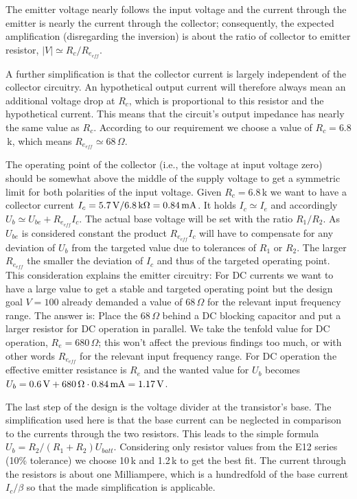 The emitter voltage nearly follows the input voltage and the current
through the emitter is nearly the current through the collector;
consequently, the expected amplification (disregarding the inversion) is
about the ratio of collector to emitter resistor,
$\left| V \right| \simeq R_c/R_{e_{eff}}$.

A further simplification is that the collector current is largely
independent of the collector circuitry. An hypothetical output current
will therefore always mean an additional voltage drop at $R_c$, which is
proportional to this resistor and the hypothetical current. This means
that the circuit's output impedance has nearly the same value as $R_c$.
According to our requirement we choose a value of $R_c=6.8$\,k, which
means $R_{e_{eff}} \simeq 68\,\Omega$.

The operating point of the collector (i.e., the voltage at input voltage
zero) should be somewhat above the middle of the supply voltage to get a
symmetric limit for both polarities of the input voltage. Given $R_c=6.8$\,k
we want to have a collector current
$I_c=5.7\text{\,V}/6.8\text{\,k}\Omega=0.84\text{\,mA}$. It holds
$I_c \simeq I_e$ and accordingly $U_b \simeq U_{be} + R_{e_{eff}} I_c$.
The actual base voltage will be set with the ratio $R_1/R_2$. As $U_{be}$
is considered constant the product $R_{e_{eff}} I_c$ will have to
compensate for any deviation of $U_b$ from the targeted value due to
tolerances of $R_1$ or $R_2$. The larger $R_{e_{eff}}$ the smaller the
deviation of $I_c$ and thus of the targeted operating point.
This consideration explains the emitter circuitry: For DC currents we want
to have a large value to get a stable and targeted operating point but the
design goal $V=100$ already demanded a value of 68\,$\Omega$ for the
relevant input frequency range. The answer is: Place the 68\,$\Omega$ behind
a DC blocking capacitor and put a larger resistor for DC operation in
parallel. We take the tenfold value for DC operation, $R_e=680\,\Omega$;
this won't affect the previous findings too much, or with other words
$R_{e_{eff}}$ for the relevant input frequency range. For DC operation the
effective emitter resistance is $R_e$ and the wanted value for $U_b$ becomes 
$U_b=0.6\text{\,V}+680\text{\,}\Omega \cdot 0.84\text{\,mA}=1.17\text{\,V}$.

The last step of the design is the voltage divider at the transistor's
base. The simplification used here is that the base current can be
neglected in comparison to the currents through the two resistors. This
leads to the simple formula $U_b = R_2/(R_1+R_2) U_{batt}$. Considering
only resistor values from the E12 series (10\% tolerance) we choose 10\,k
and 1.2\,k to get the best fit. The current through the resistors is about
one Milliampere, which is a hundredfold of the base current $I_c/\beta$ so
that the made simplification is applicable.


